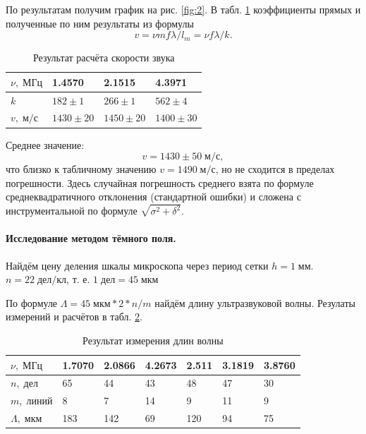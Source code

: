 \documentclass[10pt, a4paper]{article}
\begin{document}
По результатам получим график на рис. \ref{fig:2}. В табл. \ref{tab:2} коэффициенты прямых и полученные по ним результаты из формулы \begin{equation}\label{eq:2}
	v =\nu m f \lambda / l_m = \nu f \lambda / k .
\end{equation} 


\begin{table}[H]
	\centering
	\begin{tabular}{|l|l|l|l|}
		\hline
		$\nu, \; МГц$ & 1.4570       & 2.1515       & 4.3971       \\ \hline
		$k$           & $182\pm 1$   & $266\pm 1$   & $562\pm 4$  \\ \hline
		$v, \;м/с$    & $1430\pm 20$ & $1450\pm 20$ & $1400\pm 30$ \\ \hline
	\end{tabular}
	\caption{Результат расчёта скорости звука}
	\label{tab:2}
\end{table}

Среднее значение: $$ v = 1430 \pm 50 \; м/с, $$ что близко к табличному значению $ v = 1490  \; м/с $, но не сходится в пределах погрешности. Здесь случайная погрешность среднего взята по формуле среднеквадратичного отклонения (стандартной ошибки) и сложена с инструментальной по формуле $ \sqrt{\sigma^2+\delta^2} $.

\paragraph{Исследование методом тёмного поля. }

Найдём цену деления шкалы микроскопа через период сетки $ h = 1 \;мм $. $ n = 22\; дел/кл $, т. е. $ 1\; дел = 45\; мкм $

По формуле $ \Lambda = 45\;мкм * 2 * n / m $ найдём длину ультразвуковой волны.
Резулаты измерений и расчётов в табл. \ref{tab:3}.

\begin{table}[H]
	\centering
	\begin{tabular}{|l|l|l|l|l|l|l|}
		\hline
		$\nu, \; МГц$     & 1.7070 & 2.0866 & 4.2673 & 2.511 & 3.1819 & 3.8760 \\ \hline
		$n, \; дел$       & 65     & 44     & 43 & 48 & 47 & 30   \\ \hline
		$m, \; линий$     & 8      & 7      & 14 & 9  & 11 & 9 \\ \hline
		$\Lambda, \; мкм$ & 183    & 142    & 69 & 120 & 94 & 75   \\ \hline
	\end{tabular}
	\caption{Результат измерения длин волны}
	\label{tab:3}
\end{table}
\end{document}
